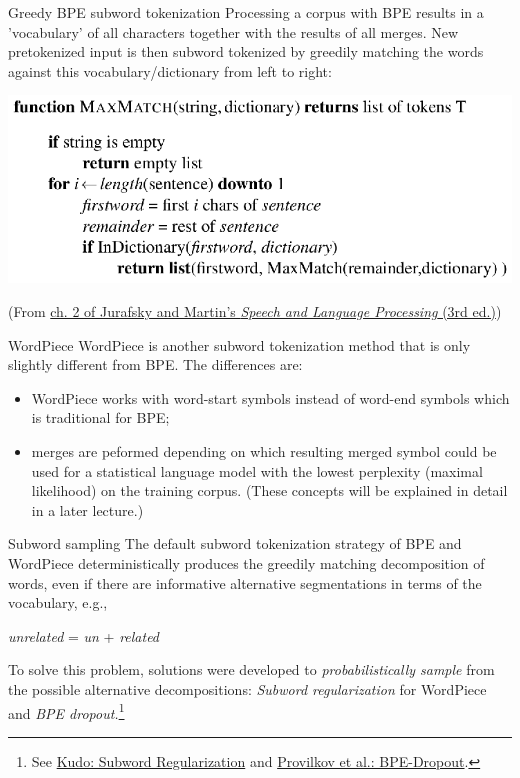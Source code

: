 \documentclass[style=upen, size=14pt]{powerdot}
\theoremstyle{definition}
\begin{document}
\begin{slide}[toc=]{Greedy BPE subword tokenization}
  Processing a corpus with BPE results in a 'vocabulary' of all characters
  together with the results of all merges. New pretokenized input is then
  subword tokenized by greedily matching the words against this
  vocabulary/dictionary from left to right:

  \includegraphics[width=1.\textwidth]{figures/max_match.eps}
  
  \footnotesize(From \href{https://web.stanford.edu/~jurafsky/slp3/2.pdf}{ch. 2 of Jurafsky and Martin's \emph{Speech and Language
      Processing} (3rd ed.)})

  \end{slide}

\begin{slide}[toc=WordPiece]{WordPiece}
  WordPiece is another subword tokenization method that is only slightly
  different from BPE. The differences are:
  \begin{itemize}
  \item WordPiece works with word-start symbols instead of word-end symbols which is
    traditional for BPE;
  \item merges are peformed depending on which resulting merged symbol could be
    used for a statistical language model with the lowest perplexity (maximal
    likelihood) on the training corpus. (These concepts will be explained in
    detail in a later lecture.)
  \end{itemize}
\end{slide}

\begin{slide}[toc=Subword sampling]{Subword sampling}
  The default subword tokenization strategy of BPE and WordPiece
  deterministically produces the greedily matching decomposition of words, even
  if there are informative alternative segmentations in terms of the vocabulary,
  e.g.,
  \begin{center}
    \emph{unrelated} = \emph{un} + \emph{related}
  \end{center}
  To solve this problem, solutions were developed to \emph{probabilistically
    sample} from the possible alternative decompositions: \emph{Subword
    regularization} for WordPiece and \emph{BPE dropout.}\footnote{See \href{https://arxiv.org/pdf/1804.10959.pdf}{Kudo: Subword Regularization} and \href{https://arxiv.org/pdf/1910.13267.pdf}{Provilkov et al.: BPE-Dropout}.}
\end{slide}
\end{document}
